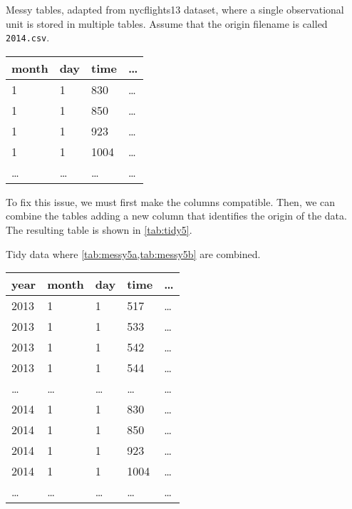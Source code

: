 \begin{tablebox}[label=tab:messy5b]{Messy tables, adapted from nycflights13 dataset, where
  a single observational unit is stored in multiple tables.  Assume that the origin
  filename is called \texttt{2014.csv}.}
  \centering
  \begin{tabular}{llll}
    \toprule
    \textbf{month} & \textbf{day} & \textbf{time} & \textbf{\dots} \\
    \midrule
    1 & 1 & 830 & \dots \\
    1 & 1 & 850 & \dots \\
    1 & 1 & 923 & \dots \\
    1 & 1 & 1004 & \dots \\
    \dots & \dots & \dots & \dots \\
    \bottomrule
  \end{tabular}
\end{tablebox}

To fix this issue, we must first make the columns compatible.  Then, we can combine the
tables adding a new column that identifies the origin of the data.  The resulting table is
shown in \cref{tab:tidy5}.

\begin{tablebox}[label=tab:tidy5]{Tidy data where \cref{tab:messy5a,tab:messy5b} are combined.}
  \centering
  \begin{tabular}{lllll}
    \toprule
    \textbf{year} & \textbf{month} & \textbf{day} & \textbf{time} & \textbf{\dots} \\
    \midrule
    2013 & 1 & 1 & 517 & \dots \\
    2013 & 1 & 1 & 533 & \dots \\
    2013 & 1 & 1 & 542 & \dots \\
    2013 & 1 & 1 & 544 & \dots \\
    \dots & \dots & \dots & \dots & \dots \\
    2014 & 1 & 1 & 830 & \dots \\
    2014 & 1 & 1 & 850 & \dots \\
    2014 & 1 & 1 & 923 & \dots \\
    2014 & 1 & 1 & 1004 & \dots \\
    \dots & \dots & \dots & \dots & \dots \\
    \bottomrule
  \end{tabular}
\end{tablebox}

\clearpage
